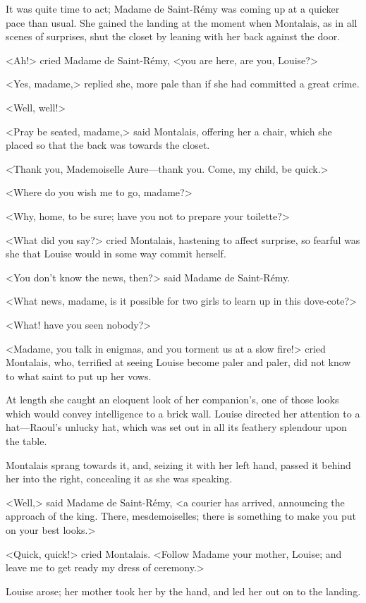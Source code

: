 It was quite time to act; Madame de Saint-Rémy was coming up at a quicker pace than usual. She gained the landing at the moment when Montalais, as in all scenes of surprises, shut the closet by leaning with her back against the door.

<Ah!> cried Madame de Saint-Rémy, <you are here, are you, Louise?>

<Yes, madame,> replied she, more pale than if she had committed a great crime.

<Well, well!>

<Pray be seated, madame,> said Montalais, offering her a chair, which she placed so that the back was towards the closet.

<Thank you, Mademoiselle Aure—thank you. Come, my child, be quick.>

<Where do you wish me to go, madame?>

<Why, home, to be sure; have you not to prepare your toilette?>

<What did you say?> cried Montalais, hastening to affect surprise, so fearful was she that Louise would in some way commit herself.

<You don't know the news, then?> said Madame de Saint-Rémy.

<What news, madame, is it possible for two girls to learn up in this dove-cote?>

<What! have you seen nobody?>

<Madame, you talk in enigmas, and you torment us at a slow fire!> cried Montalais, who, terrified at seeing Louise become paler and paler, did not know to what saint to put up her vows.

At length she caught an eloquent look of her companion's, one of those looks which would convey intelligence to a brick wall. Louise directed her attention to a hat—Raoul's unlucky hat, which was set out in all its feathery splendour upon the table.

Montalais sprang towards it, and, seizing it with her left hand, passed it behind her into the right, concealing it as she was speaking.

<Well,> said Madame de Saint-Rémy, <a courier has arrived, announcing the approach of the king. There, mesdemoiselles; there is something to make you put on your best looks.>

<Quick, quick!> cried Montalais. <Follow Madame your mother, Louise; and leave me to get ready my dress of ceremony.>

Louise arose; her mother took her by the hand, and led her out on to the landing.

